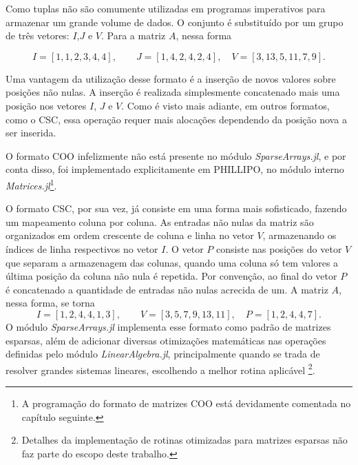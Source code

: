 Como tuplas não são comumente utilizadas em programas imperativos para armazenar um grande volume de dados. O conjunto é substituído por um grupo de três vetores: $I$,$J$ e $V$. Para a matriz $A$, nessa forma


\begin{equation}
    I =  [1, 1, 2, 3, 4, 4], \qquad J = [1, 4, 2, 4, 2, 4], \quad V = [3, 13, 5, 11, 7, 9].
    \label{eq:coo_2}
\end{equation}

Uma vantagem da utilização desse formato é a inserção de novos valores sobre posições não nulas. A inserção é realizada simplesmente concatenado mais uma posição nos vetores $I$, $J$ e $V$. Como é visto mais adiante, em outros formatos, como o CSC, essa operação requer mais alocações dependendo da posição nova a ser inserida.

O formato COO infelizmente não está presente no módulo \emph{SparseArrays.jl}, e por conta disso, foi implementado explicitamente em PHILLIPO, no módulo interno \emph{Matrices.jl}\footnote{A programação do formato de matrizes COO está devidamente comentada no capítulo seguinte.}.

O formato CSC, por sua vez, já consiste em uma forma mais sofisticado, fazendo um mapeamento coluna por coluna. As entradas não nulas da matriz são organizados em ordem crescente  de coluna e linha no vetor $V$, armazenando os índices de linha respectivos no vetor $I$. O vetor $P$ consiste nas posições do vetor $V$ que separam a armazenagem das colunas, quando uma coluna só tem valores a última posição da coluna não nula é repetida. Por convenção, ao final do vetor $P$ é concatenado a quantidade de entradas não nulas acrecida de um. A matriz $A$, nessa forma, se torna
\begin{equation}
    I = [1, 2, 4, 4, 1, 3], \qquad V = [3, 5, 7, 9, 13, 11], \quad P = [1,2,4,4,7].
    \label{eq:coo_3}
\end{equation}
O módulo \emph{SparseArrays.jl} implementa esse formato como padrão de matrizes esparsas, além de adicionar diversas otimizações matemáticas nas operações definidas pelo módulo \emph{LinearAlgebra.jl}, principalmente quando se trada de resolver grandes sistemas lineares, escolhendo a melhor rotina aplicável \footnote{Detalhes da implementação de rotinas otimizadas para matrizes esparsas não faz parte do escopo deste trabalho.}.



